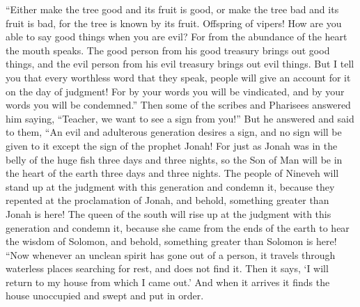 \begin{biblechapter}
 “Either make the tree good and its fruit is good, or make the tree bad and its fruit is bad, for the tree is known by its fruit.
\verse Offspring of vipers! How are you able to say good things when you are evil? For from the abundance of the heart the mouth speaks.
\verse The good person from his good treasury brings out good things, and the evil person from his evil treasury brings out evil things.
\verse But I tell you that every worthless word that they speak, people will give an account for it on the day of judgment!
\verse For by your words you will be vindicated, and by your words you will be condemned.”
 Then some of the scribes and Pharisees answered him saying, “Teacher, we want to see a sign from you!”
\verse But he answered and said to them, “An evil and adulterous generation desires a sign, and no sign will be given to it except the sign of the prophet Jonah!
\verse For just as Jonah was in the belly of the huge fish three days and three nights, so the Son of Man will be in the heart of the earth three days and three nights.
\verse The people of Nineveh will stand up at the judgment with this generation and condemn it, because they repented at the proclamation of Jonah, and behold, something greater than Jonah is here!
\verse The queen of the south will rise up at the judgment with this generation and condemn it, because she came from the ends of the earth to hear the wisdom of Solomon, and behold, something greater than Solomon is here!
 “Now whenever an unclean spirit has gone out of a person, it travels through waterless places searching for rest, and does not find it.
\verse Then it says, ‘I will return to my house from which I came out.’ And when it arrives it finds the house unoccupied and swept and put in order.

\end{biblechapter}
